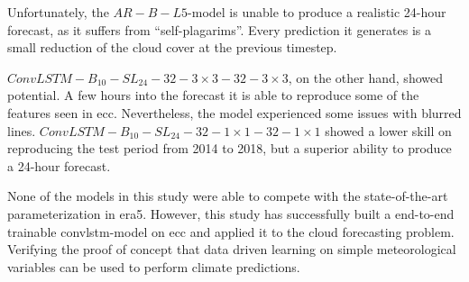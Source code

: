 Unfortunately, the $AR-B-L5$-model is unable to produce a realistic 24-hour forecast, as it suffers from ``self-plagarims''. Every prediction it generates is a small reduction of the cloud cover at the previous timestep.

$ConvLSTM-B_{10}-SL_{24}-32-3\times3-32-3 \times3$, on the other hand, showed potential. A few hours into the forecast it is able to reproduce some of the features seen in \acrshort{ecc}. Nevertheless, the model experienced some issues with blurred lines. $ConvLSTM-B_{10}-SL_{24}-32-1\times1-32-1 \times1$ showed a lower skill on reproducing the test period from 2014 to 2018, but a superior ability to produce a 24-hour forecast. 

None of the models in this study were able to compete with the state-of-the-art parameterization in \acrshort{era5}. However, this study has successfully built a end-to-end trainable \acrshort{convlstm}-model on \acrshort{ecc} and applied it to the cloud forecasting problem. Verifying the proof of concept that data driven learning on simple meteorological variables can be used to perform climate predictions.

\cleardoublepage
